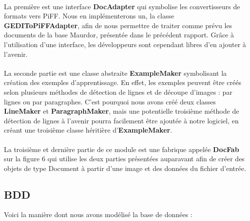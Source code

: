\paragraph{}

La première est  une interface \textbf{DocAdapter} qui symbolise les
convertisseurs de formats vers PiFF. Nous en implémenterons un, la classe
\textbf{GEDIToPiFFAdapter}, afin de nous permettre de traiter comme prévu les
documents de la base Maurdor, présentée dans le précédent rapport. Grâce à
l’utilisation d’une interface, les développeurs sont cependant libres d’en
ajouter à l’avenir.

\paragraph{}

La seconde partie est une classe abstraite \textbf{ExampleMaker} symbolisant
la création des exemples d’apprentissage. En effet, les exemples peuvent être
créés selon plusieurs méthodes de détection de lignes et de découpe d’images :
par lignes ou par paragraphes. C’est pourquoi nous avons créé deux classes
\textbf{LineMaker} et \textbf{ParagraphMaker}, mais une potentielle troisième
méthode de détection de lignes à l’avenir pourra facilement être ajoutée à
notre logiciel, en créant une troisième classe héritière
d’\textbf{ExampleMaker}.

\paragraph{}

La troisième et dernière partie de ce module est une fabrique appelée
\textbf{DocFab} sur la figure 6 qui utilise les deux parties présentées
auparavant afin de créer des objets de type Document à partir d’une image et
des données du fichier d’entrée.

\subsection{BDD}

Voici la manière dont nous avons modélisé la base de données :

\paragraph{}

